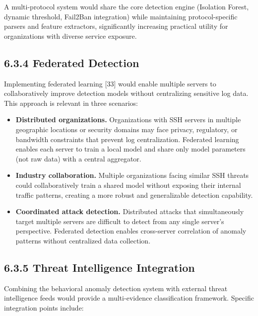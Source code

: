 \documentclass[
  a4paper]{report}
\providecommand{\tightlist}{%
  \setlength{\itemsep}{0pt}\setlength{\parskip}{0pt}}
\begin{document}
A multi-protocol system would share the core detection engine (Isolation
Forest, dynamic threshold, Fail2Ban integration) while maintaining
protocol-specific parsers and feature extractors, significantly
increasing practical utility for organizations with diverse service
exposure.

\subsection{6.3.4 Federated Detection}\label{federated-detection}

Implementing federated learning {[}33{]} would enable multiple servers
to collaboratively improve detection models without centralizing
sensitive log data. This approach is relevant in three scenarios:

\begin{itemize}
\tightlist
\item
  \textbf{Distributed organizations.} Organizations with SSH servers in
  multiple geographic locations or security domains may face privacy,
  regulatory, or bandwidth constraints that prevent log centralization.
  Federated learning enables each server to train a local model and
  share only model parameters (not raw data) with a central aggregator.
\item
  \textbf{Industry collaboration.} Multiple organizations facing similar
  SSH threats could collaboratively train a shared model without
  exposing their internal traffic patterns, creating a more robust and
  generalizable detection capability.
\item
  \textbf{Coordinated attack detection.} Distributed attacks that
  simultaneously target multiple servers are difficult to detect from
  any single server's perspective. Federated detection enables
  cross-server correlation of anomaly patterns without centralized data
  collection.
\end{itemize}

\subsection{6.3.5 Threat Intelligence
Integration}\label{threat-intelligence-integration}

Combining the behavioral anomaly detection system with external threat
intelligence feeds would provide a multi-evidence classification
framework. Specific integration points include:
\end{document}
